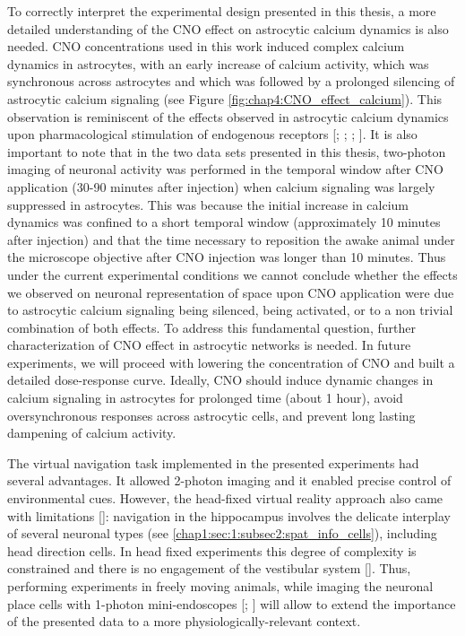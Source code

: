 To correctly interpret the experimental design presented in this thesis, a more detailed understanding of the CNO effect on astrocytic calcium dynamics is also needed.
CNO concentrations used in this work induced complex calcium dynamics in astrocytes, with an early increase of calcium activity, which was synchronous across astrocytes and which was followed by a prolonged silencing of astrocytic calcium signaling (see Figure \ref{fig:chap4:CNO_effect_calcium}). 
This observation is reminiscent of the effects observed in astrocytic calcium dynamics upon pharmacological stimulation of endogenous receptors [\cite{d2007mglur5}; \cite{fellin2004neuronal}; \cite{perea2005}; \cite{fellin2006purinergic}]. 
It is also important to note that in the two data sets presented in this thesis, two-photon imaging of neuronal activity was performed in the temporal window after CNO application (30-90 minutes after injection) when calcium signaling was largely suppressed in astrocytes. 
This was because the initial increase in calcium dynamics was confined to a short temporal window (approximately 10 minutes after injection) and that the time necessary to reposition the awake animal under the microscope objective after CNO injection was longer than 10 minutes.
Thus under the current experimental conditions we cannot conclude whether the effects we observed on neuronal representation of space upon CNO application were due to astrocytic calcium signaling being silenced, being activated, or to a non trivial combination of both effects.
To address this fundamental question, further characterization of CNO effect in astrocytic networks is needed. 
In future experiments, we will proceed with lowering the concentration of CNO and built a detailed dose-response curve. 
Ideally, CNO should induce dynamic changes in calcium signaling in astrocytes for prolonged time (about 1 hour), avoid oversynchronous responses across astrocytic cells, and prevent long lasting dampening of calcium activity. 

The virtual navigation task implemented in the presented experiments had several advantages. 
It allowed 2-photon imaging and it enabled precise control of environmental cues. 
However, the head-fixed virtual reality approach also came with limitations [\cite{minderer2016virtual}]: navigation in the hippocampus involves the delicate interplay of several neuronal types (see \ref{chap1:sec:1:subsec2:spat_info_cells}), including head direction cells. 
In head fixed experiments this degree of complexity is constrained and there is no engagement of the vestibular system [\cite{minderer2016virtual}].
Thus, performing experiments in freely moving animals, while imaging the neuronal place cells with 1-photon mini-endoscopes [\cite{flusberg2008high}; \cite{aharoni2019all}] will allow to extend the importance of the presented data to a more physiologically-relevant context.  

